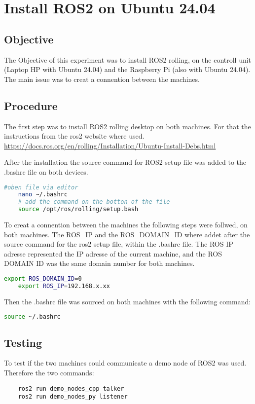\section{Install ROS2 on Ubuntu 24.04}

\subsection{Objective}
The Objective of this experiment was to install ROS2 rolling, on the controll unit (Laptop HP with Ubuntu 24.04) and the Raspberry Pi (also with Ubuntu 24.04). 
The main issue was to creat a connention between the machines. 

\subsection{Procedure}
The first step was to install ROS2 rolling desktop on both machines. For that the instructions from the ros2 website where used. 
\url{https://docs.ros.org/en/rolling/Installation/Ubuntu-Install-Debs.html}

After the installation the source command for ROS2 setup file was added to the .bashrc file on both devices. 
\begin{lstlisting}[language=bash]
    #oben file via editor
    nano ~/.bashrc
    # add the command on the botton of the file
    source /opt/ros/rolling/setup.bash
\end{lstlisting}

To creat a connention between the machines the following steps were follwed, on both machines.
The ROS\_IP and the ROS\_DOMAIN\_ID where addet after the source command for the ros2 setup file, within the .bashrc file.
The ROS IP adresse represented the IP adresse of the current machine, and the ROS DOMAIN ID was the same domain number for both machines. 


\begin{lstlisting}[language=bash] 
    export ROS_DOMAIN_ID=0
    export ROS_IP=192.168.x.xx
    \end{lstlisting}

Then the .bashrc file was sourced on both machines with the following command:
\begin{lstlisting}[language=bash] 
    source ~/.bashrc
    \end{lstlisting}


    \subsection{Testing}
To test if the two machines could communicate a demo node of ROS2 was used. 
Therefore the two commands:
\begin{lstlisting}
    ros2 run demo_nodes_cpp talker
    ros2 run demo_nodes_py listener
\end{lstlisting}

